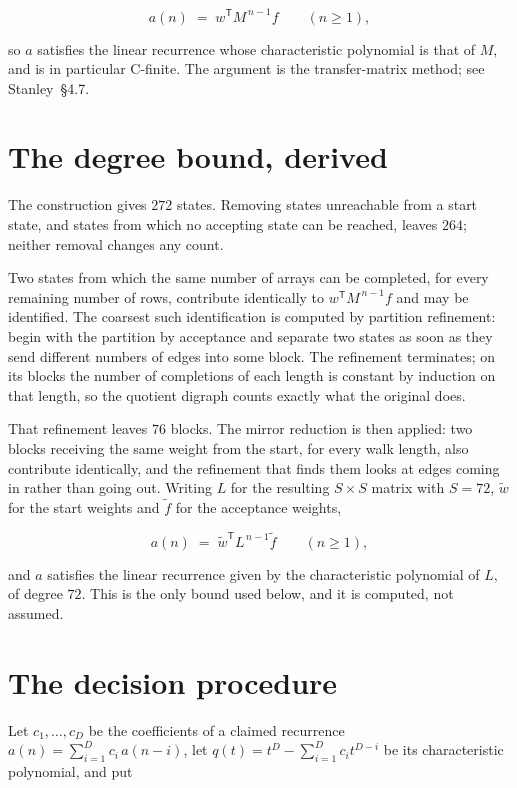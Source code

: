 \documentclass[11pt]{article}
\theoremstyle{definition}
\begin{document}
\[a(n) \;=\; w^{\mathsf T} M^{\,n-1} f \qquad (n \ge 1),\]

so $a$ satisfies the linear recurrence whose characteristic polynomial is that of $M$, and is in particular C-finite. The argument is the transfer-matrix method; see Stanley~\S4.7.

\section{The degree bound, derived}

The construction gives $272$ states. Removing states unreachable from a start state, and states from which no accepting state can be reached, leaves $264$; neither removal changes any count.

Two states from which the same number of arrays can be completed, for every remaining number of rows, contribute identically to $w^{\mathsf T}M^{\,n-1}f$ and may be identified. The coarsest such identification is computed by partition refinement: begin with the partition by acceptance and separate two states as soon as they send different numbers of edges into some block. The refinement terminates; on its blocks the number of completions of each length is constant by induction on that length, so the quotient digraph counts exactly what the original does.

That refinement leaves $76$ blocks. The mirror reduction is then applied: two blocks receiving the same weight from the start, for every walk length, also contribute identically, and the refinement that finds them looks at edges coming in rather than going out. Writing $L$ for the resulting $S \times S$ matrix with $S = 72$, $\tilde w$ for the start weights and $\tilde f$ for the acceptance weights,

\[a(n) \;=\; \tilde w^{\mathsf T} L^{\,n-1} \tilde f \qquad (n \ge 1),\]

and $a$ satisfies the linear recurrence given by the characteristic polynomial of $L$, of degree $72$. This is the only bound used below, and it is computed, not assumed.

\section{The decision procedure}

Let $c_1,\dots,c_D$ be the coefficients of a claimed recurrence $a(n) = \sum_{i=1}^{D} c_i\,a(n-i)$, let $q(t) = t^{D} - \sum_{i=1}^{D} c_i t^{D-i}$ be its characteristic polynomial, and put
\end{document}
